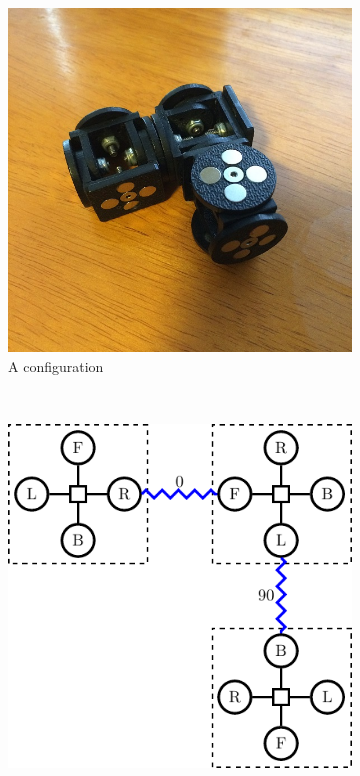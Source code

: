 \documentclass[conference]{IEEEtran}
\theoremstyle{definition}
\begin{document}
\begin{figure}
\begin{center}
        \begin{subfigure}[b]{0.4\columnwidth}
                \includegraphics[width=\textwidth]{images/smores_conf.JPG}
                \caption{A configuration}
                \label{fig:smores_conf_photo}
           \end{subfigure}
           ~
        \begin{subfigure}[b]{0.4\columnwidth}
                \includegraphics[width=\textwidth]{images/tikz/smores_conf.pdf}

\end{subfigure}
\end{center}
\end{figure}
\end{document}
